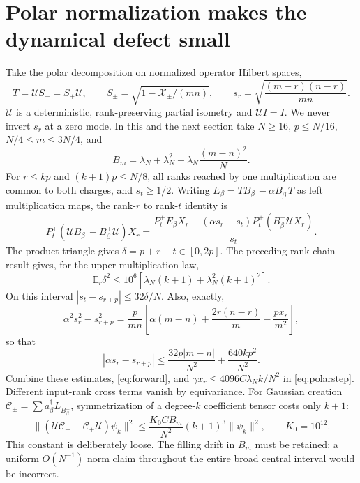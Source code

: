 \documentclass[11pt,a4paper]{article}
\newcommand{\EE}{\mathbb E}
\newcommand{\XX}{\mathscr X}
\begin{document}
\newpage
\section{Polar normalization makes the dynamical defect small}
Take the polar decomposition on normalized operator Hilbert spaces,
\begin{equation}
 T=\mathcal U S_-=S_+\mathcal U,\qquad
 S_\pm=\sqrt{1-\XX_\pm/(mn)},\qquad
 s_r=\sqrt{\frac{(m-r)(n-r)}{mn}}.
\end{equation}
$\mathcal U$ is a deterministic, rank-preserving partial isometry
and $\mathcal U I=I$. We never invert $s_r$ at a zero mode.
In this and the next section take $N\ge16$, $p\le N/16$,
$N/4\le m\le3N/4$, and
\begin{equation}
 B_m=\lambda_N+\lambda_N^2+
       \lambda_N\frac{(m-n)^2}{N}.
\end{equation}
For $r\le kp$ and $(k+1)p\le N/8$, all ranks reached by one
multiplication are common to both charges, and $s_t\ge1/2$.
Writing $E_\beta=TB_\beta^- -\alpha B_\beta^+T$ as left
multiplication maps, the rank-$r$ to rank-$t$ identity is
\begin{equation}
 P_t^+(\mathcal U B_\beta^- -B_\beta^+\mathcal U)X_r
 =\frac{P_t^+E_\beta X_r
       +(\alpha s_r-s_t)P_t^+(B_\beta^+\mathcal U X_r)}{s_t}.
 \label{eq:polarstep}
\end{equation}
The product triangle gives $\delta=p+r-t\in[0,2p]$. The preceding
rank-chain result gives, for the upper multiplication law,
\begin{equation}
 \EE_r\delta^2\le10^6[\lambda_N(k+1)+\lambda_N^2(k+1)^2].
\end{equation}
On this interval $|s_t-s_{r+p}|\le32\delta/N$. Also, exactly,
\begin{equation}
 \alpha^2s_r^2-s_{r+p}^2
 =\frac{p}{mn}\left[\alpha(m-n)+\frac{2r(n-r)}m
                                      -\frac{p x_r}{m^2}\right],
\end{equation}
so that
\begin{equation}
 |\alpha s_r-s_{r+p}|
 \le\frac{32p|m-n|}{N^2}+\frac{640kp^2}{N^2}.
\end{equation}
Combine these estimates, \eqref{eq:forward}, and
$\gamma x_r\le4096C\lambda_N k/N^2$ in \eqref{eq:polarstep}.
Different input-rank cross terms vanish by equivariance. For Gaussian
creation $\mathcal C_\pm=\sum a_\beta^\dagger L_{B_\beta^\pm}$,
symmetrization of a degree-$k$ coefficient tensor costs only $k+1$:
\begin{equation}
 \|(\mathcal U\mathcal C_- -\mathcal C_+\mathcal U)\psi_k\|^2
 \le\frac{K_0 C B_m}{N^2}(k+1)^3\|\psi_k\|^2,
 \qquad K_0=10^{12}.
 \label{eq:creation}
\end{equation}
This constant is deliberately loose. The filling drift in $B_m$
must be retained; a uniform $O(N^{-1})$ norm claim throughout the
entire broad central interval would be incorrect.
\end{document}
